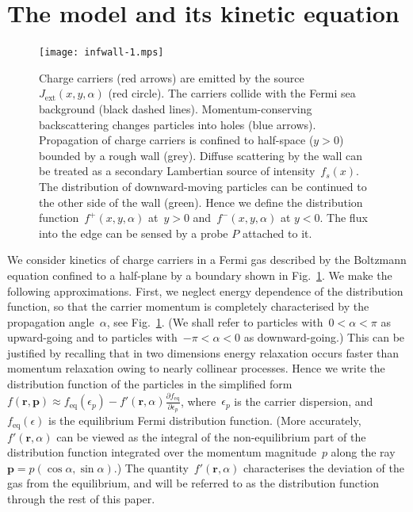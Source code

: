 \documentclass[preprint,aps,eqsecnum]{revtex4-1}
\newcommand{\fplus}[1]{{#1}^{+}}
\newcommand{\fminus}[1]{{#1}^{-}}
\begin{document}
\section{The model and its kinetic equation}
\label{sec:boltzmann}
\begin{figure}
   \texttt{[image: infwall-1.mps]}
  \caption{
  \label{fig:setup}
  Charge carriers (red arrows) are emitted by the
  source~$J_\mathrm{ext}(x, y, \alpha)$ (red circle). The carriers collide with
  the Fermi sea  background (black dashed lines). Momentum-conserving backscattering
  changes particles into holes (blue arrows). Propagation of charge carriers
  is confined to half-space ($y > 0$) bounded by a rough wall (grey).
  Diffuse scattering by the wall can be treated as a secondary
  Lambertian source of intensity~$f_s(x)$. The distribution of downward-moving
  particles can be continued to the other side of the wall (green).
  Hence we define  the distribution function~$\fplus{f}(x, y, \alpha)$
  at~$y > 0$ and~$\fminus{f}(x, y, \alpha)$ at $y < 0$. The flux into
  the edge can be sensed by a probe $P$ attached to it.
}
\end{figure}
We consider kinetics of charge carriers in a Fermi gas
described by the Boltzmann equation
confined to a half-plane by a boundary shown in Fig.~\ref{fig:setup}.
We make the following approximations. First, we neglect
energy dependence of the distribution function, so that the carrier momentum
is completely characterised by the propagation angle~$\alpha$, see
Fig.~\ref{fig:setup}. (We shall refer to particles with~$0 < \alpha < \pi$
as upward-going and to particles with~$-\pi < \alpha < 0$ as downward-going.)
This can be justified by recalling that in two dimensions
energy relaxation occurs faster than momentum
relaxation\cite{bib:momentum-relaxation} owing to nearly collinear processes.
Hence  we write the distribution function
of the particles in the simplified form~$f({\bm r}, {\bm p})
\approx f_{\mathrm{eq}}(\epsilon_p)
- f' ({\bm r}, \alpha) \frac{\partial f_{\mathrm{eq}}}{\partial \epsilon_p}$,
where~$\epsilon_p$ is the carrier dispersion, and~$f_\mathrm{eq}(\epsilon)$
is the equilibrium Fermi distribution function.
(More accurately, $f'({\bm r}, \alpha)$ can be viewed as the integral
of the non-equilibrium part of the distribution function integrated
over the momentum magnitude~$p$ along
the ray~${\bm p} = p (\cos\alpha, \sin\alpha)$.)
The quantity~$f'({\bm r}, \alpha)$ characterises the deviation of the gas
from the equilibrium, and will be referred to as the distribution
function through the rest of this paper.
\end{document}
